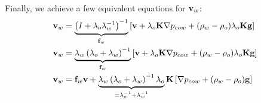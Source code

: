 \documentclass[12pt,a4paper]{scrartcl}
\newcommand{\fb}{{\bf f}}
\newcommand{\gb}{{\bf g}}
\newcommand{\vb}{{\bf v}}
\newcommand{\Kb}{{\bf K}}
\begin{document}
Finally, we achieve a few equivalent equations for $\vb_w$:
\begin{align*}
  \vb_w
  & = \underbrace{\left(I + \lambda_o\lambda_w^{-1}\right)^{-1}}_{\fb_w}
  \left[\vb + \lambda_o\Kb\nabla p_{cow} + (\rho_w - \rho_o)\lambda_o\Kb\gb\right] \\
  \vb_w
  & = \underbrace{\lambda_w\left(\lambda_o + \lambda_w\right)^{-1}}_{\fb_w}
  \left[\vb + \lambda_o\Kb\nabla p_{cow} + (\rho_w - \rho_o)\lambda_o\Kb\gb\right] \\
  \vb_w
  & = \fb_w \vb +
  \underbrace{\lambda_w\left(\lambda_o + \lambda_w\right)^{-1}\lambda_o}_{= \lambda_o^{-1} + \lambda_w^{-1}}
  \Kb\left[\nabla p_{cow} + (\rho_w - \rho_o)\gb\right] \\
\end{align*}
\end{document}
